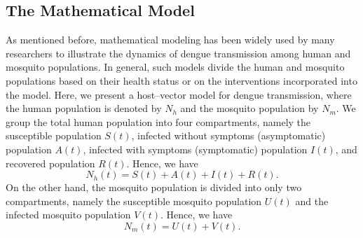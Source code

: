 \documentclass[preprint]{elsarticle}
\begin{document}
\subsection{The Mathematical Model}
As mentioned before, mathematical modeling has been widely used by many researchers to illustrate the dynamics of dengue transmission among human and mosquito populations. In general, such models divide the human and mosquito populations based on their health status or on the interventions incorporated into the model. Here, we present a host--vector model for dengue transmission, where the human population is denoted by $N_h$ and the mosquito population by $N_m$. We group the total human population into four compartments, namely the susceptible population $S(t)$, infected without symptoms (asymptomatic) population $A(t)$, infected with symptoms (symptomatic) population $I(t)$, and recovered population $R(t)$. Hence, we have
\[
N_h(t) = S(t) + A(t) + I(t) + R(t).
\]
On the other hand, the mosquito population is divided into only two compartments, namely the susceptible mosquito population $U(t)$ and the infected mosquito population $V(t)$. Hence, we have
\[
N_m(t) = U(t) + V(t).
\]
\newpage
\end{document}
